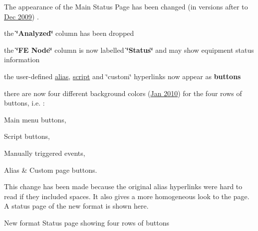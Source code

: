 \label{RC_mhttpd_status_page_redesign_idx_mhttpd_page_status}
\hypertarget{RC_mhttpd_status_page_redesign_idx_mhttpd_page_status}{}


\par
 \label{RC_mhttpd_status_page_redesign_alias_buttons_status_page}
\hypertarget{RC_mhttpd_status_page_redesign_alias_buttons_status_page}{}
  The appearance of the Main Status Page has been changed (in versions after to \hyperlink{NDF_ndf_dec_2009}{Dec 2009}) . 
\begin{DoxyItemize}
\item the {\bfseries \char`\"{}Analyzed\char`\"{}} column has been dropped 
\item the {\bfseries \char`\"{}FE Node\char`\"{}} column is now labelled {\bfseries \char`\"{}Status\char`\"{}} and may show equipment status information 
\item the user-\/defined \hyperlink{RC_mhttpd_Alias_page_RC_mhttpd_alias_buttons}{alias}, \hyperlink{RC_mhttpd_status_page_features_RC_mhttpd_status_script_buttons}{script} and \char`\"{}custom\char`\"{} hyperlinks now appear as {\bfseries buttons} 
\item there are now four different background colors (\hyperlink{NDF_ndf_jan_2010}{Jan 2010}) for the four rows of buttons, i.e. : 
\begin{DoxyItemize}
\item Main menu buttons, 
\item Script buttons, 
\item Manually triggered events, 
\item Alias \& Custom page buttons. 
\end{DoxyItemize}

This change has been made because the original alias hyperlinks were hard to read if they included spaces. It also gives a more homogeneous look to the page. A status page of the new format is shown here. 
\end{DoxyItemize}

\par
 \begin{center} New format Status page showing four rows of buttons \par
\par
\par
  \end{center}  \par
\par
\par


